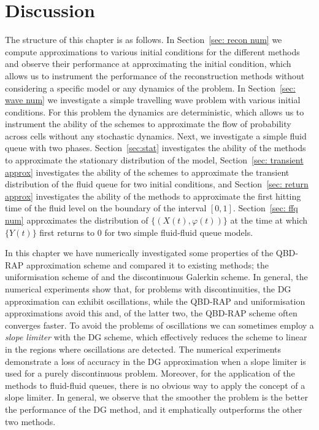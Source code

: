 \section{Discussion}

The structure of this chapter is as follows. In Section~\ref{sec: recon num} we compute approximations to various initial conditions for the different methods and observe their performance at approximating the initial condition, which allows us to instrument the performance of the reconstruction methods without considering a specific model or any dynamics of the problem. In Section~\ref{sec: wave num} we investigate a simple travelling wave problem with various initial conditions. For this problem the dynamics are deterministic, which allows us to instrument the ability of the schemes to approximate the flow of probability across cells without any stochastic dynamics. Next, we investigate a simple fluid queue with two phases. Section~\ref{sec:stat} investigates the ability of the methods to approximate the stationary distribution of the model, Section~\ref{sec: transient approx} investigates the ability of the schemes to approximate the transient distribution of the fluid queue for two initial conditions, and Section~\ref{sec: return approx} investigates the ability of the methods to approximate the first hitting time of the fluid level on the boundary of the interval \([0,1]\). Section~\ref{sec: ffq num} approximates the distribution of \(\{(X(t),\varphi(t))\}\) at the time at which \(\{Y(t)\}\) first returns to \(0\) for two simple fluid-fluid queue models.  

In this chapter we have numerically investigated some properties of the QBD-RAP approximation scheme and compared it to existing methods; the uniformisation scheme of \cite{bo2013} and the discontinuous Galerkin scheme. In general, the numerical experiments show that, for problems with discontinuities, the DG approximation can exhibit oscillations, while the QBD-RAP and uniformisation approximations avoid this and, of the latter two, the QBD-RAP scheme often converges faster. To avoid the problems of oscillations we can sometimes employ a \emph{slope limiter} with the DG scheme, which effectively reduces the scheme to linear in the regions where oscillations are detected. The numerical experiments demonstrate a loss of accuracy in the DG approximation when a slope limiter is used for a purely discontinuous problem. Moreover, for the application of the methods to fluid-fluid queues, there is no obvious way to apply the concept of a slope limiter. %
In general, we observe that the smoother the problem is the better the performance of the DG method, and it emphatically outperforms the other two methods. 

